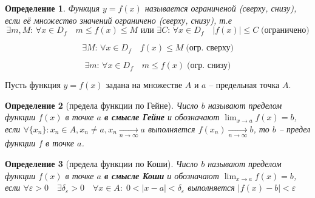 \documentclass[a4paper,oneside]{article}
\newcommand{\dslim}{\displaystyle\lim}
\newcommand{\approach}[1]{\underset{#1}{\longrightarrow}}
\newtheorem{definition}{Определение}[subsection]
\begin{document}
\begin{definition}
    Функция $y = f(x)$ называется ограниченой (сверху, снизу), если её множество
    значений ограничено (сверху, снизу), т.е 
    \[
        \exists m, M: \, \forall x \in D_f \quad m \le f(x) \le M
        \text{ или }
        \exists C: \, \forall x \in D_f \quad  | f(x) | \le C
        \; \text{(ограничено)}
    \]

    \[\exists M: \, \forall x \in D_f \quad f(x) \le M \; \text{(огр. сверху)}\]

    \[\exists m: \, \forall x \in D_f \quad m \le f(x) \; \text{(огр. снизу)}\]
\end{definition}

Пусть функция $y = f(x)$ задана на множестве $A$ и $a$ -- предельная точка $A$.

\begin{definition}[предела функции по Гейне]
    Число $b$ называют пределом функции $f(x)$ в точке $a$ \textbf{в смысле Гейне}
    и обозначают $\dslim_{x \to a} f(x) = b$, если
    $\forall \{ x_n \}: x_n \in A, x_n \ne a, x_n \approach{n \to \infty} a$ выполняется
    $f(x_n) \approach{n \to \infty} b$, то $b$ -- предел функции $f$ в точке $a$.
\end{definition}

\begin{definition}[предела функции по Коши]
    Число $b$ называют пределом функции $f(x)$ в точке $a$ \textbf{в смысле Коши}
    и обозначают $\dslim_{x \to a} f(x) = b$, если
    $\forall \varepsilon > 0 \quad \exists \delta_\varepsilon > 0 \quad
    \forall x \in A : \; 0 < | x - a | < \delta_\varepsilon$ выполняется
    $|f(x) - b| < \varepsilon$
\end{definition}
\end{document}
